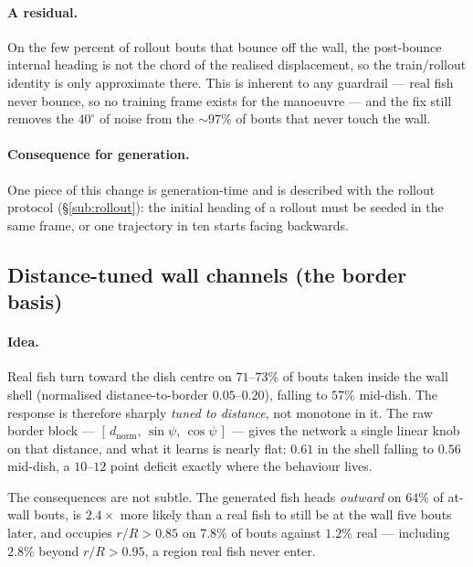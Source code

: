 \paragraph{A residual.} On the few percent of rollout bouts that bounce off the wall, the
post-bounce internal heading is not the chord of the realised displacement, so the train/rollout
identity is only approximate there. This is inherent to any guardrail --- real fish never bounce,
so no training frame exists for the manoeuvre --- and the fix still removes the $40^\circ$ of noise
from the ${\sim}97\%$ of bouts that never touch the wall.

\paragraph{Consequence for generation.} One piece of this change is generation-time and is
described with the rollout protocol (\S\ref{sub:rollout}): the initial heading of a rollout must be
seeded in the same frame, or one trajectory in ten starts facing backwards.


\subsection{Distance-tuned wall channels (the border basis)}
\label{sub:borderbasis}

\paragraph{Idea.} Real fish turn toward the dish centre on $71$--$73\%$ of bouts taken inside the
wall shell (normalised distance-to-border $0.05$--$0.20$), falling to $57\%$ mid-dish. The response
is therefore sharply \emph{tuned to distance}, not monotone in it. The raw border block ---
$[\,d_{\text{norm}},\,\sin\psi,\,\cos\psi\,]$ --- gives the network a single linear knob on that
distance, and what it learns is nearly flat: $0.61$ in the shell falling to $0.56$ mid-dish, a
$10$--$12$ point deficit exactly where the behaviour lives.

The consequences are not subtle. The generated fish heads \emph{outward} on $64\%$ of at-wall
bouts, is $2.4\times$ more likely than a real fish to still be at the wall five bouts later, and
occupies $r/R>0.85$ on $7.8\%$ of bouts against $1.2\%$ real --- including $2.8\%$ beyond
$r/R>0.95$, a region real fish never enter.

